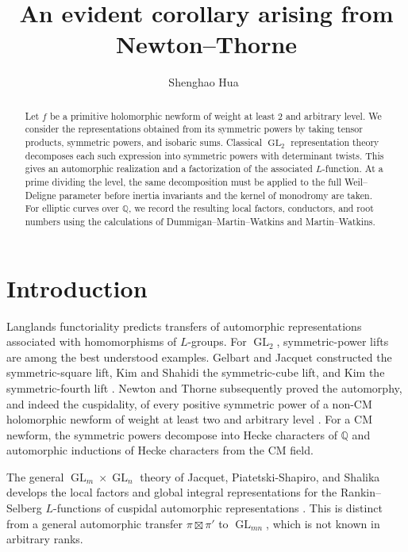\documentclass[11pt,reqno]{amsart}
\title{An evident corollary arising from Newton--Thorne}
\author{Shenghao Hua~\orcidlink{0000-0002-7210-2650}}
\theoremstyle{definition}
\theoremstyle{remark}
\newcommand{\Q}{\mathbb Q}
\newcommand{\GL}{\operatorname{GL}}
\begin{document}
\begin{abstract}
Let $f$ be a primitive holomorphic newform of weight at least $2$ and
arbitrary level.  We consider the representations obtained from its
symmetric powers by taking tensor products, symmetric powers, and isobaric
sums.  Classical $\GL_2$ representation theory decomposes each such
expression into symmetric powers with determinant twists.  This gives an
automorphic realization and a factorization of the associated $L$-function.
At a prime dividing the level, the same decomposition must be applied to the
full Weil--Deligne parameter before inertia invariants and the kernel of
monodromy are taken.  For elliptic curves over $\Q$, we record the resulting
local factors, conductors, and root numbers using the calculations of
Dummigan--Martin--Watkins and Martin--Watkins.
\end{abstract}

\maketitle
\begingroup
\small
\tableofcontents
\endgroup

\section{Introduction}

Langlands functoriality predicts transfers of automorphic representations associated with homomorphisms of $L$-groups.
For $\GL_2$, symmetric-power lifts are among the best understood examples.
Gelbart and Jacquet constructed the symmetric-square lift, Kim and Shahidi
the symmetric-cube lift, and Kim the symmetric-fourth lift \cite{GelbartJacquet,KimShahidi,Kim}.  Newton and Thorne subsequently proved the automorphy, and indeed the cuspidality, of every positive symmetric power of a non-CM holomorphic newform of weight at least two and arbitrary level \cite{NewtonThorne2021a,NewtonThorne2021b}.  For a CM newform, the symmetric powers decompose into Hecke characters of $\Q$ and automorphic inductions of Hecke characters from the CM field.

The general $\GL_m\times\GL_n$ theory of Jacquet, Piatetski-Shapiro, and Shalika develops the local factors and global integral representations for the Rankin--Selberg $L$-functions of cuspidal automorphic representations \cite{JPSS}.
This is distinct from a general automorphic transfer $\pi\boxtimes\pi'$ to $\GL_{mn}$, which is not known in arbitrary ranks.
\end{document}
